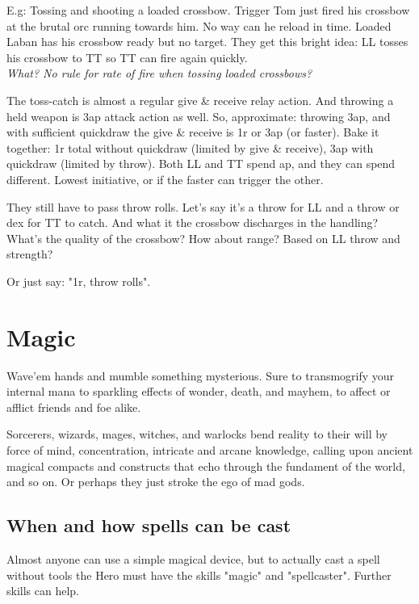 E.g: Tossing and shooting a loaded crossbow.
Trigger Tom just fired his crossbow at the brutal orc running towards him. No way can he reload in time. Loaded Laban has his crossbow ready but no target. They get this bright idea: LL tosses his crossbow to TT so TT can fire again quickly.\\ \emph{What? No rule for rate of fire when tossing loaded crossbows?}

The toss-catch is almost a regular give \& receive relay action. And throwing a held weapon is 3ap attack action as well. So, approximate: throwing 3ap, and with sufficient quickdraw the give \& receive is 1r or 3ap (or faster). Bake it together: 1r total without quickdraw (limited by give \& receive), 3ap with quickdraw (limited by throw). Both LL and TT spend ap, and they can spend different. Lowest initiative, or if the faster can trigger the other.

They still have to pass throw rolls. Let's say it's a throw for LL and a throw or dex for TT to catch. And what it the crossbow discharges in the handling? What's the quality of the crossbow? How about range? Based on LL throw and strength?

\noindent Or just say: "1r, throw rolls".















\section*{Magic}


Wave'em hands and mumble something mysterious. Sure to transmogrify your internal mana to sparkling effects of wonder, death, and mayhem, to affect or afflict friends and foe alike.

Sorcerers, wizards, mages, witches, and warlocks bend reality to their will by force of mind, concentration, intricate and arcane knowledge, calling upon ancient magical compacts and constructs that echo through the fundament of the world, and so on. Or perhaps they just stroke the ego of mad gods.


\subsection*{When and how spells can be cast}
Almost anyone can use a simple magical device, but to actually cast a spell without tools the Hero must have the skills "magic" and "spellcaster". Further skills can help.

